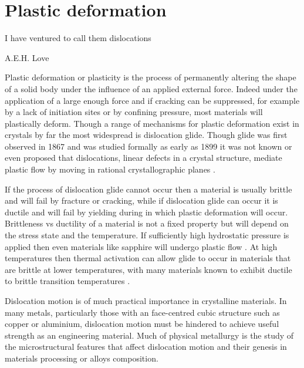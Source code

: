 
\chapter{Plastic deformation}  %


\epigraph{I have ventured to call them dislocations}{A.E.H. Love}




\graphicspath{{Chapter1/Figs/Vector/}{Chapter1/Figs/Raster/}{Chapter1/Figs/PDF/}{Chapter1/Figs/}}

Plastic deformation or plasticity is the process of permanently altering the shape of a solid body under the influence of an applied external force. Indeed under the application of a large enough force and if cracking can be suppressed, for example by a lack of initiation sites or by confining pressure, most materials will plastically deform. Though a range of mechanisms for plastic deformation exist in crystals by far the most widespread is dislocation glide. Though glide was first observed in 1867 \cite{Reusch1867} and was studied formally as early as 1899 \cite{Ewing1899,Ewing1900} it was not known or even proposed that dislocations, linear defects in a crystal structure, mediate plastic flow by moving in rational crystallographic planes \cite{Kelly2012ch7}.

If the process of dislocation glide cannot occur then a material is usually {brittle} and will fail by fracture or cracking, while if dislocation glide can occur it is {ductile} and will fail by yielding during in which plastic deformation will occur. Brittleness vs ductility of a material is not a fixed property but will depend on the stress state and the temperature. If sufficiently high hydrostatic pressure is applied then even materials like sapphire will undergo plastic flow \cite{Bridgman1947}. At high temperatures then thermal activation can allow glide to occur in materials that are brittle at lower temperatures, with many materials known to exhibit ductile to brittle transition temperatures   \cite{Kelly2012ch7}.

Dislocation motion is of much practical importance in crystalline materials. In many metals, particularly those with an face-centred cubic structure such as copper or aluminium, dislocation motion must be hindered to achieve useful strength as an engineering material. Much of physical metallurgy is the study of the microstructural features that affect dislocation motion and their genesis in materials processing or alloys composition.

